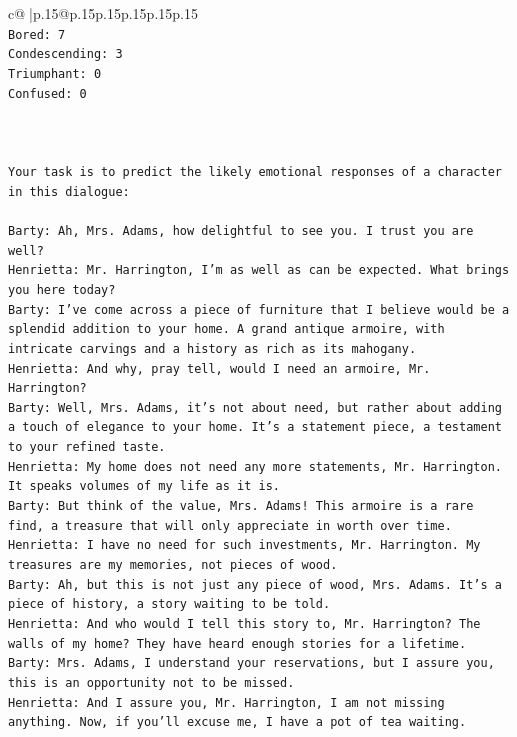 \documentclass{article}
\begin{document}
{\begin{supertabular}{c@{$\;$}|p{.15\linewidth}@{}p{.15\linewidth}p{.15\linewidth}p{.15\linewidth}p{.15\linewidth}p{.15\linewidth}}
{{{\\ 
\texttt{Bored: 7} \\
\texttt{Condescending: 3} \\
\texttt{Triumphant: 0} \\
\texttt{Confused: 0} \\
\\ 
\\ 
\\ 
\texttt{Your task is to predict the likely emotional responses of a character in this dialogue:} \\
\\ 
\texttt{Barty: Ah, Mrs. Adams, how delightful to see you. I trust you are well?} \\
\texttt{Henrietta: Mr. Harrington, I'm as well as can be expected. What brings you here today?} \\
\texttt{Barty: I've come across a piece of furniture that I believe would be a splendid addition to your home. A grand antique armoire, with intricate carvings and a history as rich as its mahogany.} \\
\texttt{Henrietta: And why, pray tell, would I need an armoire, Mr. Harrington?} \\
\texttt{Barty: Well, Mrs. Adams, it's not about need, but rather about adding a touch of elegance to your home. It's a statement piece, a testament to your refined taste.} \\
\texttt{Henrietta: My home does not need any more statements, Mr. Harrington. It speaks volumes of my life as it is.} \\
\texttt{Barty: But think of the value, Mrs. Adams! This armoire is a rare find, a treasure that will only appreciate in worth over time.} \\
\texttt{Henrietta: I have no need for such investments, Mr. Harrington. My treasures are my memories, not pieces of wood.} \\
\texttt{Barty: Ah, but this is not just any piece of wood, Mrs. Adams. It's a piece of history, a story waiting to be told.} \\
\texttt{Henrietta: And who would I tell this story to, Mr. Harrington? The walls of my home? They have heard enough stories for a lifetime.} \\
\texttt{Barty: Mrs. Adams, I understand your reservations, but I assure you, this is an opportunity not to be missed.} \\
\texttt{Henrietta: And I assure you, Mr. Harrington, I am not missing anything. Now, if you'll excuse me, I have a pot of tea waiting.} \\
}}}
\end{supertabular}}
\end{document}

